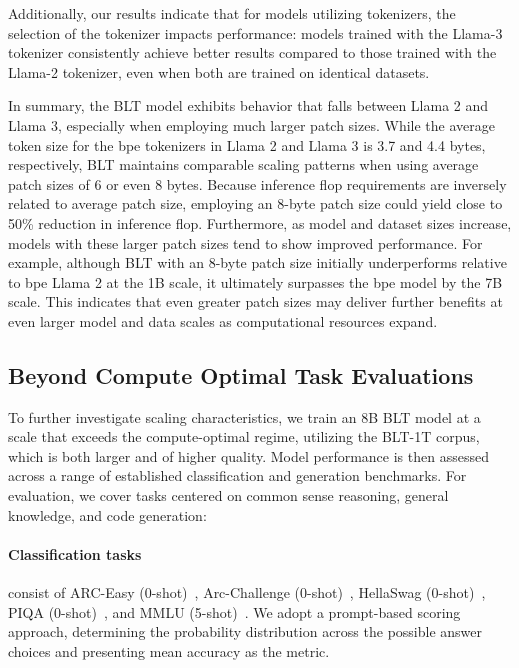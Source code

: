 Additionally, our results indicate that for models utilizing tokenizers, the selection of the tokenizer impacts performance: models trained with the Llama-3 tokenizer consistently achieve better results compared to those trained with the Llama-2 tokenizer, even when both are trained on identical datasets.

In summary, the {\textsc BLT} model exhibits behavior that falls between Llama 2 and Llama 3, especially when employing much larger patch sizes. While the average token size for the bpe tokenizers in Llama 2 and Llama 3 is 3.7 and 4.4 bytes, respectively, {\textsc BLT} maintains comparable scaling patterns when using average patch sizes of 6 or even 8 bytes. Because inference flop requirements are inversely related to average patch size, employing an 8-byte patch size could yield close to 50\% reduction in inference flop. Furthermore, as model and dataset sizes increase, models with these larger patch sizes tend to show improved performance. For example, although {\textsc BLT} with an 8-byte patch size initially underperforms relative to bpe Llama 2 at the 1B scale, it ultimately surpasses the bpe model by the 7B scale. This indicates that even greater patch sizes may deliver further benefits at even larger model and data scales as computational resources expand.

\subsection{Beyond Compute Optimal Task Evaluations}
\label{section:evals}
To further investigate scaling characteristics, we train an 8B {\textsc BLT} model at a scale that exceeds the compute-optimal regime, utilizing the {\textsc BLT}-1T corpus, which is both larger and of higher quality. Model performance is then assessed across a range of established classification and generation benchmarks. For evaluation, we cover tasks centered on common sense reasoning, general knowledge, and code generation:
\paragraph{Classification tasks} consist of ARC-Easy (0-shot)~\citep{Eval_ARC}, Arc-Challenge (0-shot)~\citep{Eval_ARC}, HellaSwag (0-shot)~\citep{Eval_hellaswag}, PIQA (0-shot)~\citep{Eval_piqa}, and MMLU (5-shot)~\citep{hendrycks2020measuring}. We adopt a prompt-based scoring approach, determining the probability distribution across the possible answer choices and presenting mean accuracy as the metric.
